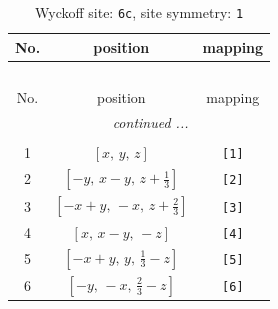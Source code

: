 \documentclass[fleqn,8pt]{jsarticle}
\begin{document}
\renewcommand{\arraystretch}{1.2}
\begin{longtable}{ccc}
\caption{Wyckoff site: {\tt 6c}, site symmetry: {\tt 1}}
 \\
 \hline \hline
No. & position & mapping \\ \hline \endfirsthead

\multicolumn{2}{l}{\tablename\ \thetable{}} \\
 \hline \hline
No. & position & mapping \\ \hline \endhead

 \hline \hline
\multicolumn{2}{r}{\footnotesize\it continued ...} \\ \endfoot

 \hline \hline
\multicolumn{2}{r}{} \\ \endlastfoot

1 & $\left[ x,\, y,\, z \right]$ & {\tt [1]} \\ \hline
2 & $\left[ - y,\, x - y,\, z + \frac{1}{3} \right]$ & {\tt [2]} \\ \hline
3 & $\left[ - x + y,\, - x,\, z + \frac{2}{3} \right]$ & {\tt [3]} \\ \hline
4 & $\left[ x,\, x - y,\, - z \right]$ & {\tt [4]} \\ \hline
5 & $\left[ - x + y,\, y,\, \frac{1}{3} - z \right]$ & {\tt [5]} \\ \hline
6 & $\left[ - y,\, - x,\, \frac{2}{3} - z \right]$ & {\tt [6]} \\
\end{longtable}
\end{document}
